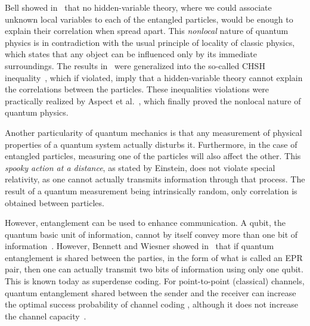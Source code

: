 Bell showed in~\cite{Bell64} that no hidden-variable theory, where we could associate unknown local variables to each of the entangled particles, would be enough to explain their correlation when spread apart. This \emph{nonlocal} nature of quantum physics is in contradiction with the usual principle of locality of classic physics, which states that any object can be influenced only by its immediate surroundings. The results in~\cite{Bell64} were generalized into the so-called CHSH inequality~\cite{CHSH69}, which if violated, imply that a hidden-variable theory cannot explain the correlations between the particles. These inequalities violations were practically realized by Aspect et al.~\cite{ADG82}, which finally proved the nonlocal nature of quantum physics.

Another particularity of quantum mechanics is that any measurement of physical properties of a quantum system actually disturbs it. Furthermore, in the case of entangled particles, measuring one of the particles will also affect the other. This \emph{spooky action at a distance}, as stated by Einstein, does not violate special relativity, as one cannot actually transmits information through that process. The result of a quantum measurement being intrinsically random, only correlation is obtained between particles.

However, entanglement can be used to enhance communication. A qubit, the quantum basic unit of information, cannot by itself convey more than one bit of information~\cite{Holevo73}. However, Bennett and Wiesner showed in~\cite{BW92} that if quantum entanglement is shared between the parties, in the form of what is called an EPR pair, then one can actually transmit two bits of information using only one qubit. This is known today as superdense coding. For point-to-point (classical) channels, quantum entanglement shared between the sender and the receiver can increase the optimal success probability of channel coding \cite{CLMW10,PLMKR11}, although it does not increase the channel capacity~\cite{BBCJPW93,BSST99}. 

